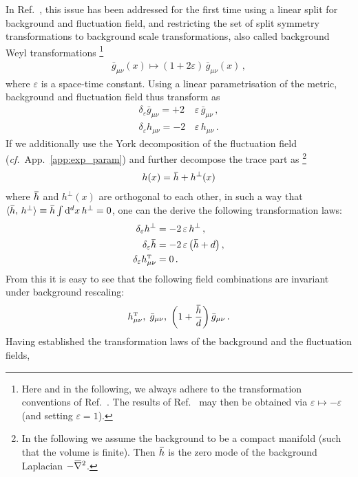 \documentclass[11pt]{book}
\newcommand{\overbar}[1]{\mkern 1.5mu\overline{\mkern-1.5mu#1\mkern-1.5mu}\mkern 1.5mu}
\newcommand\hT{ h^{\scriptscriptstyle{\mathrm{T}} } }
\newcommand{\bnabla}{\overbar \nabla}
\newcommand{\weyl}{\delta_\varepsilon}
\newcommand\cf{\textit{cf.}\ }
\numberwithin{equation}{chapter}
\begin{document}
In Ref.~\cite{Morris:2016spn}, this issue has been addressed for the first time
using a linear split for background and fluctuation field, and restricting
the set of split symmetry transformations to background scale transformations,
also called background Weyl transformations%
\footnote{
  Here and in the following, we always
  adhere to the transformation conventions of Ref.~\cite{Percacci:2016arh}.
  The results of Ref.~\cite{Morris:2016spn} may then be obtained via
  $\varepsilon \mapsto -\varepsilon$ (and setting $\varepsilon = 1$).
}
\begin{align}
  \bar g_{\mu \nu}(x) \mapsto (1 + 2 \varepsilon) \, \bar g_{\mu\nu}(x) \,,
\end{align}
where $\varepsilon$ is a space-time constant.
Using a linear parametrisation of the metric, background and fluctuation field
thus transform as
\begin{align}
  \weyl \bar g_{\mu \nu} = + 2 \, & \varepsilon \, \bar g_{\mu\nu} \,, \\
  \weyl      h_{\mu \nu} = - 2 \, & \varepsilon \,      h_{\mu\nu} \,.
\end{align}
If we additionally use the York decomposition of the fluctuation field
(\cf App.~\ref{app:exp_param}) and further decompose the trace part as%
\footnote{
  In the following we assume the background to be a compact manifold
  (such that the volume is finite). Then $\overbar h$ is the zero mode
  of the background Laplacian $-\bnabla^2$.
}%
\begin{align}
  h(x) = \overbar h + h^\perp(x)
\end{align}
where $\overbar h$ and $h^\perp(x)$ are orthogonal to each other,
in such a way that
$\langle \overbar h,\,h^\perp \rangle \equiv \overbar h \int \mathrm d^dx \, h^\perp = 0$,
one can the derive the following transformation laws:
\begin{align}
  \weyl h^\perp       &= - 2 \, \varepsilon \, h^\perp \,, \\
  \weyl \overbar h    &= - 2 \, \varepsilon \, \big( \overbar h + d \big) \,, \\
  \weyl \hT_{\mu \nu} &= 0 \,.
\end{align}
From this it is easy to see that the following field combinations are invariant
under background rescaling:
\begin{align}
  \hT_{\mu\nu}, \; \bar g_{\mu\nu}, \; \left( 1 + \frac{\overbar h }{d} \right) \bar g_{\mu\nu} \,.
\end{align}
Having established the transformation laws of the background and the fluctuation fields,
\end{document}
